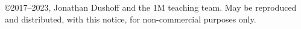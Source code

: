 \copyright 2017--2023, Jonathan Dushoff and the 1M teaching team.  May be reproduced and distributed, with this notice, for non-commercial purposes only.

